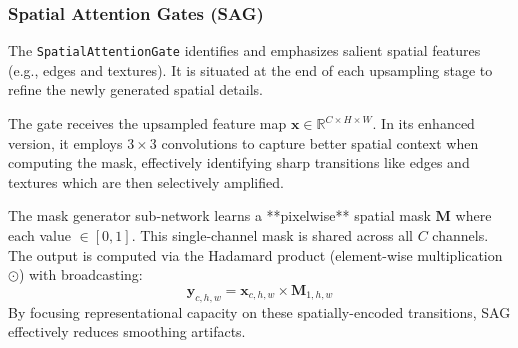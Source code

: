 \documentclass[11pt]{article}
\begin{document}
\subsubsection{Spatial Attention Gates (SAG)}
The \texttt{SpatialAttentionGate} identifies and emphasizes salient spatial features (e.g., edges and textures). It is situated at the end of each upsampling stage to refine the newly generated spatial details.

\begin{center}
\end{center}

The gate receives the upsampled feature map $\mathbf{x} \in \mathbb{R}^{C \times H \times W}$. In its enhanced version, it employs $3\times3$ convolutions to capture better spatial context when computing the mask, effectively identifying sharp transitions like edges and textures which are then selectively amplified.

The mask generator sub-network learns a **pixelwise** spatial mask $\mathbf{M}$ where each value $\in [0, 1]$. This single-channel mask is shared across all $C$ channels. The output is computed via the Hadamard product (element-wise multiplication $\odot$) with broadcasting:
\[
    \mathbf{y}_{c,h,w} = \mathbf{x}_{c,h,w} \times \mathbf{M}_{1,h,w}
\]
By focusing representational capacity on these spatially-encoded transitions, SAG effectively reduces smoothing artifacts.
\end{document}
